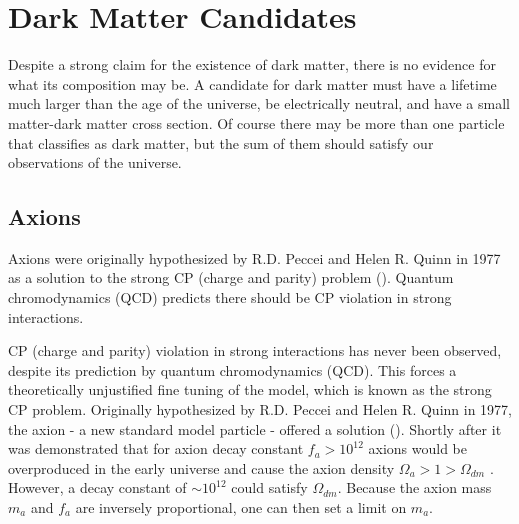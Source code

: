





\section[Dark Matter Candidates][Dark Matter Candidates]{Dark Matter Candidates}
\label{sec:dmcandidates}
Despite a strong claim for the existence of dark matter, there is no evidence for what its composition may
be.  A candidate for dark matter must have a lifetime much larger than the age of the universe, be electrically
neutral, and have a small matter-dark matter cross section.  Of course there may be more than one particle
that classifies as dark matter, but the sum of them should satisfy our observations of the universe.

\subsection{Axions} \label{subsec:axions}
Axions were originally hypothesized by R.D. Peccei and Helen R. Quinn in 1977 as a solution to the strong CP
(charge and parity) problem ().  Quantum chromodynamics (QCD) predicts there should be
CP violation in strong interactions.

CP (charge and parity) violation in strong interactions has never been observed, despite its prediction
by quantum chromodynamics (QCD).  This forces a theoretically unjustified fine tuning of the model, which
is known as the strong CP problem.  Originally hypothesized by R.D. Peccei and Helen R. Quinn in 1977, the
axion - a new standard model particle - offered a solution ().  Shortly after it was
demonstrated that for axion decay constant $f_{a} > 10^{12}$ axions would be overproduced in the
early universe and cause the axion density $\Omega_{a} > 1 > \Omega_{dm}$ .  However,
a decay constant of $\sim 10^{12}$ could satisfy $\Omega_{dm}$.  Because the axion mass $m_{a}$ and $f_{a}$
are inversely proportional, one can then set a limit on $m_{a}$.

